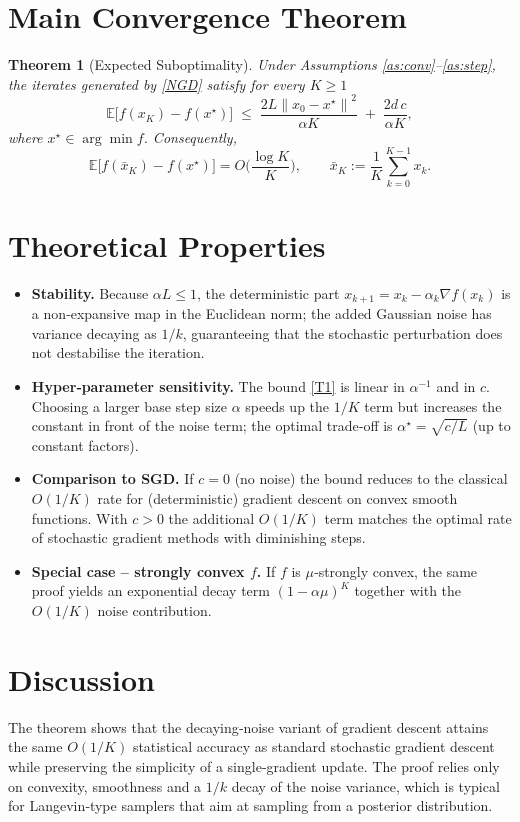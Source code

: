 \documentclass{article}
\newtheorem{theorem}{Theorem}
\newcommand{\E}{\mathbb{E}}
\newcommand{\norm}[1]{\left\lVert #1\right\rVert}
\begin{document}
\section*{Main Convergence Theorem}
\begin{theorem}[Expected Suboptimality]\label{thm:main}
Under Assumptions \ref{as:conv}–\ref{as:step}, the iterates generated by \eqref{NGD} satisfy for every $K\ge 1$
\[
\E\!\big[f(x_K)-f(x^\star)\big]\;\le\;
\frac{2L\norm{x_0-x^\star}^{2}}{\alpha K}
\;+\;
\frac{2d\,c}{\alpha K},
\tag{T1}
\]
where $x^\star\in\arg\min f$.
Consequently,
\[
\E\!\big[f(\bar x_K)-f(x^\star)\big]=O\!\Big(\frac{\log K}{K}\Big),
\qquad 
\bar x_K:=\frac{1}{K}\sum_{k=0}^{K-1}x_k .
\tag{T2}
\]
\end{theorem}

\section*{Theoretical Properties}
\begin{itemize}
\item \textbf{Stability.} Because $\alpha L\le 1$, the deterministic part $x_{k+1}=x_k-\alpha_k\nabla f(x_k)$ is a non‑expansive map in the Euclidean norm; the added Gaussian noise has variance decaying as $1/k$, guaranteeing that the stochastic perturbation does not destabilise the iteration.
\item \textbf{Hyper‑parameter sensitivity.} The bound \eqref{T1} is linear in $\alpha^{-1}$ and in $c$. Choosing a larger base step size $\alpha$ speeds up the $1/K$ term but increases the constant in front of the noise term; the optimal trade‑off is $\alpha^\star=\sqrt{c/L}$ (up to constant factors).
\item \textbf{Comparison to SGD.} If $c=0$ (no noise) the bound reduces to the classical $O(1/K)$ rate for (deterministic) gradient descent on convex smooth functions. With $c>0$ the additional $O(1/K)$ term matches the optimal rate of stochastic gradient methods with diminishing steps.
\item \textbf{Special case – strongly convex $f$.} If $f$ is $\mu$‑strongly convex, the same proof yields an exponential decay term $ (1-\alpha\mu)^{K}$ together with the $O(1/K)$ noise contribution.
\end{itemize}

\section*{Discussion}
The theorem shows that the decaying‑noise variant of gradient descent attains the same $O(1/K)$ statistical accuracy as standard stochastic gradient descent while preserving the simplicity of a single‑gradient update. The proof relies only on convexity, smoothness and a $1/k$ decay of the noise variance, which is typical for Langevin‑type samplers that aim at sampling from a posterior distribution.
\end{document}
